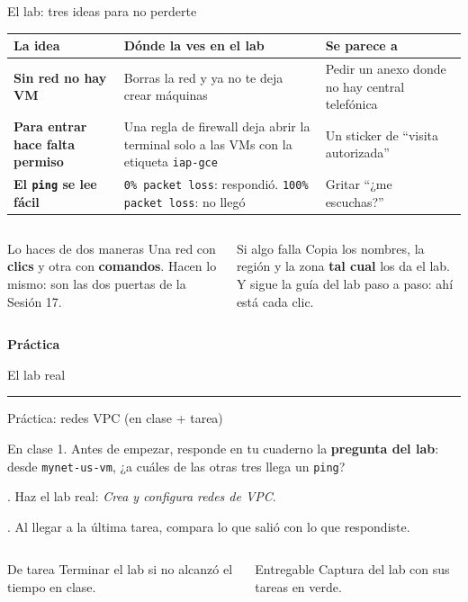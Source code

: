 \documentclass[aspectratio=169,10pt,c]{beamer}
\newcommand{\separador}[2]{%
\begin{frame}[plain]
\vfill
\begin{center}
{\fontsize{29}{34}\selectfont\bfseries #1}\par
\vspace{2mm}
{\small #2}\par
\vspace{4mm}
{\color{utpRojo}\rule{8.5cm}{1.2pt}}
\end{center}
\vfill
\end{frame}}
\begin{document}
\begin{frame}{El lab: tres ideas para no perderte}
\renewcommand{\arraystretch}{1.45}
\centering\small
\begin{tabular}{@{}>{\raggedright\arraybackslash}p{3.6cm}>{\raggedright\arraybackslash}p{5.3cm}>{\raggedright\arraybackslash}p{4.0cm}@{}}
\toprule
\textbf{La idea} & \textbf{Dónde la ves en el lab} & \textbf{Se parece a}\\
\midrule
\textbf{Sin red no hay VM} & Borras la red y ya no te deja crear máquinas & Pedir un anexo donde no hay central telefónica\\
\textbf{Para entrar hace falta permiso} & Una regla de firewall deja abrir la terminal solo a las VMs con la etiqueta \texttt{iap-gce} & Un sticker de ``visita autorizada''\\
\textbf{El \texttt{ping} se lee fácil} & \texttt{0\% packet loss}: respondió. \texttt{100\% packet loss}: no llegó & Gritar ``¿me escuchas?''\\
\bottomrule
\end{tabular}
\par\vspace{3mm}
\begin{columns}[T,onlytextwidth]
\begin{exampleblock}{Lo haces de dos maneras}
\small Una red con \textbf{clics} y otra con \textbf{comandos}. Hacen lo mismo: son las dos puertas de la Sesión 17.
\end{exampleblock}
\begin{alertblock}{Si algo falla}
\small Copia los nombres, la región y la zona \textbf{tal cual} los da el lab. Y sigue la guía del lab paso a paso: ahí está cada clic.
\end{alertblock}
\end{columns}
\end{frame}

\separador{Práctica}{El lab real}

\begin{frame}{Práctica: redes VPC \textnormal{\small(en clase + tarea)}}
\begin{block}{En clase}
\small
1. Antes de empezar, responde en tu cuaderno la \textbf{pregunta del lab}: desde \texttt{mynet-us-vm}, ¿a cuáles de las otras tres llega un \texttt{ping}?\par{}. Haz el lab real: \emph{Crea y configura redes de VPC}.\par{}. Al llegar a la última tarea, compara lo que salió con lo que respondiste.
\end{block}
\begin{columns}[T,onlytextwidth]
\begin{exampleblock}{De tarea}
\small Terminar el lab si no alcanzó el tiempo en clase.
\end{exampleblock}
\begin{alertblock}{Entregable}
\small Captura del lab con sus tareas en verde.
\end{alertblock}
\end{columns}
\end{frame}
\end{document}
